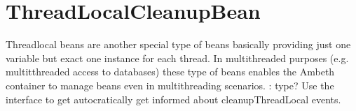 \section{ThreadLocalCleanupBean}
\label{feature:ThreadLocalCleanupBean}
\ClearAPI
Threadlocal beans are another special type of beans basically providing just one variable but exact one instance for each thread. In multithreaded purposes (e.g. multitthreaded access to databases) these type of beans enables the Ambeth container to manage beans even in multithreading scenarios.
\TODO : type?
Use the   interface to get autocratically get informed about cleanupThreadLocal events.